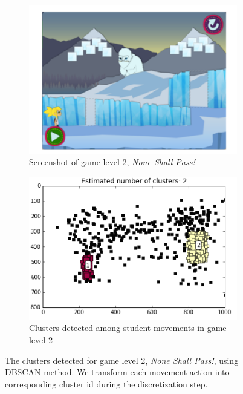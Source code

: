 \documentclass{sigchi}
\begin{document}
\begin{figure}[t]
 \centering
\begin{subfigure}{.5\textwidth}
	\centering
	\includegraphics[width=0.9\columnwidth]{figures/glacier_screenshot.png}
	\caption{Screenshot of game level 2, \textit {None Shall Pass!} \label{fig:screenshot}}
\end{subfigure}
\begin{subfigure}{.5\textwidth}
	\centering
	\includegraphics[width=0.9\columnwidth]{figures/glacier_positions.png}
	\caption{Clusters detected among student movements in game level 2 \label{fig:clustering}}
\end{subfigure}
\caption{The clusters detected for game level 2, \textit {None Shall Pass!}, using DBSCAN method. We transform each movement action into corresponding cluster id during the discretization step.\label{fig:figurecluster}}
\end{figure}
\end{document}
